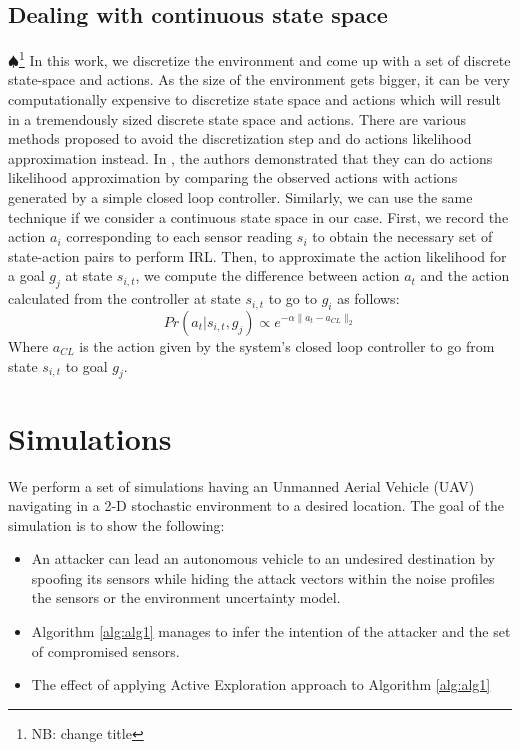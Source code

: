\documentclass[letterpaper, 10 pt, conference]{ieeeconf}  %
\newcommand\NB[1]{$\spadesuit$\footnote{NB: #1}}
\begin{document}
\subsection{Dealing with continuous state space}\NB{change title}
In this work, we discretize the environment and come up with a set of discrete state-space and actions. As the size of the environment gets bigger, it can be very computationally expensive to discretize state space and actions which will result in a tremendously sized discrete state space and actions. There are various methods proposed to avoid the discretization step and do actions likelihood approximation instead. In \cite{Michini2013}, the authors demonstrated that they can do actions likelihood approximation by comparing the observed actions with actions generated by a simple closed loop controller. Similarly, we can use the same technique if we consider a continuous state space in our case. First, we record the action $a_i$ corresponding to each sensor reading $s_i$ to obtain the necessary set of state-action pairs to perform IRL. Then, to approximate the action likelihood for a goal $g_j$ at state $s_{i,t}$, we compute the difference between action $a_t$ and the action calculated from the controller at state $s_{i,t}$ to go to $g_i$ as follows:
\begin{equation}
 Pr(a_t|s_{i,t},g_j) \propto e^{-\alpha \lVert a_t - a_{CL} \rVert_{2}}
\end{equation}
Where $a_{CL}$ is the action given by the system's closed loop controller to go from state $s_{i,t}$ to goal $g_j$.
\section{Simulations}\label{sec:simulations}
We perform a set of simulations having an Unmanned Aerial Vehicle (UAV) navigating in a 2-D stochastic environment to a desired location. The goal of the simulation is to show the following:
\begin{itemize}
    \item An attacker can lead an autonomous vehicle to an undesired destination by spoofing its sensors while hiding the attack vectors within the noise profiles the sensors or the environment uncertainty model.
    \item Algorithm \ref{alg:alg1} manages to infer the intention of the attacker and the set of compromised sensors.
    \item The effect of applying Active Exploration approach to Algorithm \ref{alg:alg1}
\end{itemize}
\end{document}
